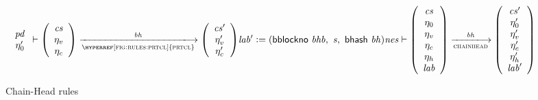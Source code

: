 \begin{figure}[ht]
\begin{equation}
{{{\begin{array}{c}
            \var{pd} \\
            \eta_0' \\
         \end{array}}
        \vdash
        {\left(\begin{array}{c}
              \var{cs} \\
              \eta_v \\
              \eta_c \\
        \end{array}\right)}
        \trans{\hyperref[fig:rules:prtcl]{prtcl}}{\var{bh}}
        {\left(\begin{array}{c}
              \var{cs'} \\
              \eta_v' \\
              \eta_c' \\
        \end{array}\right)}
      } \\~\\~\\
      \var{lab'}\leteq (\bblockno{bhb},~\var{s},~\bhash{bh} ) \\
    }
    {
      \var{nes}
      \vdash
      {\left(\begin{array}{c}
            \var{cs} \\
            \eta_0 \\
            \eta_v \\
            \eta_c \\
            \eta_h \\
            \var{lab} \\
      \end{array}\right)}
      \trans{chainhead}{\var{bh}}
      {\left(\begin{array}{c}
            \var{cs}' \\
            \eta_0' \\
            \eta_v' \\
            \eta_c' \\
            \eta_h' \\
            \var{lab}' \\
      \end{array}\right)}
    }
  \end{equation}
  \caption{Chain-Head rules}
  \label{fig:rules:chainhead}
\end{figure}

